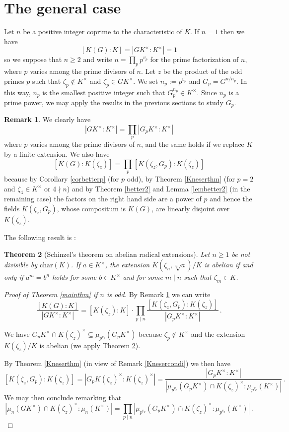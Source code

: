 \documentclass[11pt, a4paper]{amsart}
\newtheorem {thm}{Theorem}
\theoremstyle{definition}
\newtheorem {rem}[thm]{Remark}
\newcommand{\ch}{\mathrm{char}}
\renewcommand{\geq}{\geqslant}
\begin{document}
\section{The general case}

Let $n$ be a positive integer coprime to the characteristic of $K$. If $n=1$ then we have 
$$[K(G):K]=|GK^\times:K^\times|=1$$
so we suppose that $n\geq 2$ and write 
$n=\prod_{p} p^{v_p}$ for the prime factorization of $n$, where $p$ varies among the prime divisors of $n$. Let $z$ be the product of the odd primes $p$ such that $\zeta_p\notin K^\times$ and $\zeta_p\in GK^\times$.
We set $n_p:=p^{v_p}$ and $G_p=G^{n/n_p}$. In this way, $n_p$ is the smallest positive integer such that $G_p^{n_p}\in K^\times$. Since $n_p$ is a prime power, we may apply the results in the previous sections to study $G_p$.

\begin{rem}\label{split}
We clearly have
$$|GK^\times:K^\times|=\prod_p |G_pK^\times:K^\times|$$
where $p$ varies among the prime divisors of $n$, and the same holds if we replace $K$ by a finite extension. We also have
$$[K(G):K(\zeta_z)]=\prod_p [K(\zeta_z,G_p):K(\zeta_z)]$$
because by Corollary \ref{corbetterp} (for $p$ odd), by Theorem \ref{Kneserthm} (for $p=2$ and $\zeta_4\in K^\times$ or $4\nmid n$) and by 
Theorem \ref{better2} and Lemma \ref{lembetter2} (in the remaining case) the factors on the right hand side are a power of $p$ and hence the fields $K(\zeta_z,G_p)$, whose compositum is $K(G)$, are linearly disjoint over $K(\zeta_z)$.
\end{rem}

The following result is \cite[Theorem 2]{Schinzel-ab}:

\begin{thm}[Schinzel's theorem on abelian radical extensions]\label{Schinzel-abelian}
Let $n\geq 1$ be not divisible by $\ch(K)$. 
If $a\in K^\times$, the extension $K(\zeta_{n}, \sqrt[n]{a})/K$ is abelian if and only if $a^{m}=b^{n}$ holds for some $b\in K^{\times}$ and for some $m\mid n$ such that $\zeta_{m}\in K$.
\end{thm}

\begin{proof}[Proof of Theorem \ref{mainthm} if $n$ is odd]
By Remark \ref{split} we can write
$$\frac{[K(G):K]}{|GK^\times:K^\times|}=[K(\zeta_z):K]\cdot \prod_{p\mid n}
    \frac{[K(\zeta_z,G_p):K(\zeta_z)]}{|G_pK^\times:K^\times|}\,.
    $$

We have $G_pK^\times \cap K(\zeta_z)^\times \subseteq \mu_{p^{v_p}}(G_p K^\times)$ because $\zeta_p\notin K^\times$ and the extension $K(\zeta_z)/K$ is abelian (we apply Theorem \ref{Schinzel-abelian}).
    
By Theorem \ref{Kneserthm} (in view of Remark \ref{Knesercondi}) we then have 
$$[K(\zeta_z,G_p):K(\zeta_z)]=|G_pK(\zeta_z)^\times:K(\zeta_z)^\times|=\frac{|G_pK^\times:K^\times|}{|\mu_{p^{v_p}}(G_p K^\times)\cap K(\zeta_z)^\times:\mu_{p^{v_p}}( K^\times)|}\,.
    $$
We may then conclude remarking that 
$$|\mu_{n}(G K^\times)\cap K(\zeta_z)^\times:\mu_{n}(K^\times)|=\prod_{p\mid n}|\mu_{p^{v_p}}(G_p K^\times)\cap K(\zeta_z)^\times: \mu_{p^{v_p}}( K^\times)|\,.$$
\end{proof}
\end{document}
